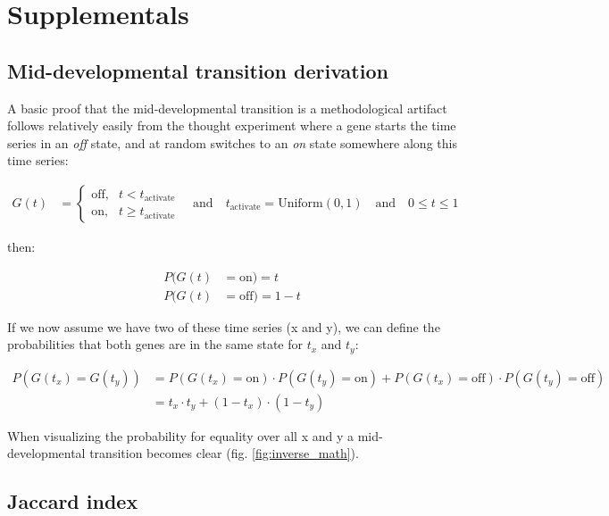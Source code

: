 \section{Supplementals}

\subsection{Mid-developmental transition derivation}\label{subsection:middevelopmenttransition}

A basic proof that the mid-developmental transition is a methodological artifact follows relatively easily from the thought experiment where a gene starts the time series in an \textit{off} state, and at random switches to an \textit{on} state somewhere along this time series:

\begin{align*}    
    G(t) & = \begin{cases} \text{off},& t < t_{\text{activate}} \\ \text{on},& t \geq t_{\text{activate}} \end{cases} \quad \textrm{and} \quad
    t_{\text{activate}} = \text{Uniform}(0, 1) \quad \textrm{and} \quad
    0 \leq t \leq 1
\end{align*}

then:

\begin{align*}
    P(G(t) & = \text{on}) = t \\
    P(G(t) & = \text{off}) = 1 - t
\end{align*}

If we now assume we have two of these time series (x and y), we can define the probabilities that both genes are in the same state for $t_x$ and $t_y$:

\begin{align*}
    P(G(t_x) = G(t_y)) & = P(G(t_x) = \text{on}) \cdot P(G(t_y) = \text{on}) + P(G(t_x) = \text{off}) \cdot P(G(t_y) = \text{off}) \\
    & = t_x \cdot t_y + (1 - t_x) \cdot (1-t_y)
\end{align*}

When visualizing the probability for equality over all x and y a mid-developmental transition becomes clear (fig. \ref{fig:inverse_math}).

\subsection{Jaccard index}\label{subsection:flypeaks}

